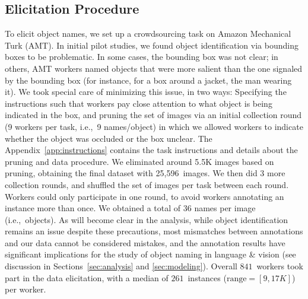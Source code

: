 
\subsection{Elicitation Procedure}
\label{ssec:elicitation}
To elicit object names, we set up a crowdsourcing task on Amazon Mechanical Turk (AMT).
In initial pilot studies, we found object identification via bounding boxes to be problematic.
In some cases, the bounding box was not clear; in others, AMT workers named objects that were more salient than the one signaled by the bounding box (for instance, for a box around a jacket, the man wearing it).
We took special care of minimizing this issue, in two ways: Specifying the instructions such that workers pay close attention to what object is being indicated in the box, and pruning the set of images via an initial collection round (9 workers per task, i.e.,\ 9 names/object) in which we allowed workers to indicate whether the object was occluded or the box unclear.
The Appendix~\ref{app:instructions} contains the task instructions and details about the pruning and data procedure.
We eliminated around 5.5K images based on pruning, obtaining the final dataset with 25,596\ images.
We then did 3 more collection rounds, and shuffled the set of images per task between each round. 
Workers could only participate in one round, to avoid workers annotating an instance more than once. 
We obtained a total of 36 names per image (i.e.,\ objects).
As will become clear in the analysis, while object identification remains an issue despite these precautions, most mismatches between \vg annotations  and our data cannot be considered mistakes, and the annotation results have significant implications for the study of object naming in language \& vision (see discussion in Sections~\ref{sec:analysis} and \ref{sec:modeling}).
Overall $841$\ workers took part in the data elicitation, with a median of  $261$\ instances \mbox{($\textrm{range}=[9,17K]$)} per worker.
